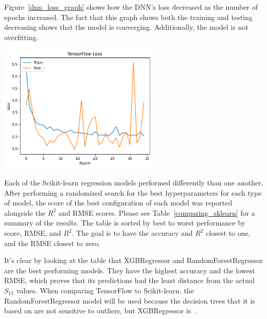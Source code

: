 \documentclass[lettersize,journal]{IEEEtran}
\newenvironment{Figure}
    {\par\medskip\noindent\minipage{\linewidth}}
    {\endminipage\par\medskip}
\begin{document}
Figure~\ref{dnn_loss_graph} shows how the DNN's loss decreased as the number of epochs increased. The fact that this graph shows both the training and testing decreasing shows that the model is converging. Additionally, the model is not overfitting. 

\begin{Figure}
    \centering
    \includegraphics[width=3in]{loss}
    \label{dnn_loss_graph}
\end{Figure}

Each of the Scikit-learn regression models performed differently than one another. After performing a randomized search for the best hyperparameters for each type of model, the score of the best configuration of each model was reported alongside the $R^2$ and RMSE scores. Please see Table~\ref{comparing_sklearn} for a summary of the results. The table is sorted by best to worst performance by score, RMSE, and $R^2$. The goal is to have the accuracy and $R^2$ closest to one, and the RMSE closest to zero. 

It's clear by looking at the table that XGBRegressor and RandomForestRegressor are the best performing models. They have the highest accuracy and the lowest RMSE, which proves that its predictions had the least distance from the actual $S_{11}$ values. When comparing TensorFlow to Scikit-learn, the RandomForestRegressor model will be used because the decision trees that it is based on are not sensitive to outliers, but XGBRegressor is~\cite{BROWN2009541,Li_2018}. 
\end{document}
